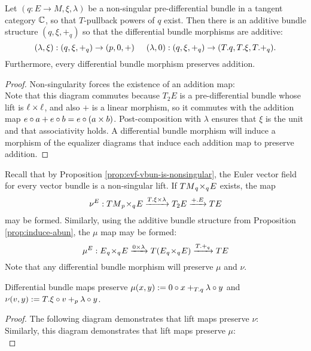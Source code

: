 \begin{proposition}%
  \label{prop:induce-abun}
  Let $(q:E \to M, \xi, \lambda)$ be a non-singular pre-differential bundle in a tangent category $\mathbb{C}$, so that $T$-pullback powers of $q$ exist.
  Then there is an additive bundle structure $(q,\xi,+_q)$ so that the differential bundle morphisms are additive:
  \[
    (\lambda,\xi): (q,\xi,+_q) \to (p,0,+) \hspace{0.5cm}
    (\lambda,0): (q,\xi,+_q) \to (T.q,T.\xi,T.+_q).
  \]
  Furthermore, every differential bundle morphism preserves addition.
\end{proposition}
\begin{proof}
  Non-singularity forces the existence of an addition map: 
  \[
    
  \]
  Note that this diagram commutes because $T_2E$ is a pre-differential bundle whose lift is $\ell \times \ell$, and also $+$ is a linear morphism, so it commutes with the addition map $e\circ a + e\circ b = e \circ (a\times b)$. Post-composition with $\lambda$ ensures that $\xi$ is the unit and that associativity holds. A differential bundle morphism will induce a morphism of the equalizer diagrams that induce each addition map to preserve addition.
\end{proof}

Recall that by Proposition \ref{prop:evf-vbun-is-nonsingular}, the Euler vector field for every vector bundle is a non-singular lift. If $TM {_{q}}\!\times_{q}\! E$ exists, the map
\[
  \nu^E: TM {_{p}}\!\times_{q}\! E \xrightarrow[]{T.\xi \times \lambda} T_2E \xrightarrow[]{+.E} TE
\] may be formed. Similarly, using the additive bundle structure from Proposition \ref{prop:induce-abun}, the $\mu$ map may be formed: 
\[
  \mu^E: E {_{q}}\!\times_{q}\! E \xrightarrow[]{0 \times \lambda} T(E{_{q}}\!\times_{q}\!E) \xrightarrow[]{T.+_q} TE
\]
Note that any differential bundle morphism will preserve $\mu$ and $\nu$.
\begin{lemma}%
  \label{lem:pre-mu-nu}
  Differential bundle maps preserve $\mu(x,y) := 0 \circ x +_{T.q} \lambda \circ y$ and $\nu(v,y) := T.\xi \circ v +_p \lambda \circ y$.
\end{lemma}
\begin{proof}
  The following diagram demonstrates that lift maps preserve $\nu$:
  \[\]
  Similarly, this diagram demonstrates that lift maps preserve $\mu$:
  \[\]
\end{proof}

